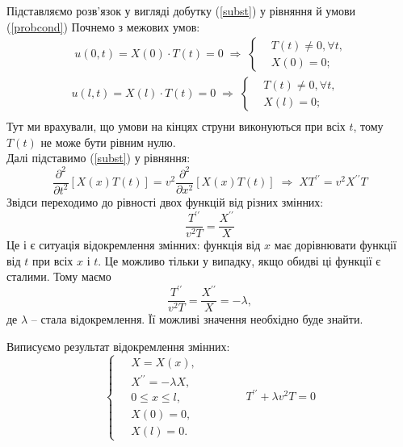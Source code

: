 Підставляємо розв'язок у вигляді добутку (\ref{subst})  у рівняння й умови (\ref{probcond}) Почнемо з межових умов:
\begin{equation*}
    \begin{aligned}
        \;u(0,t) = X(0) \cdot T(t) = 0
        \;\Rightarrow\;
        \left\{ \begin{aligned}
            &T(t) \neq 0, \forall t, \\  &X(0) = 0; 
        \end{aligned} \right.\\
        u(l,t) = X(l) \cdot T(t) = 0
        \;\Rightarrow\;
        \left\{ \begin{aligned}
            &T(t) \neq 0, \forall t, \\  &X(l) = 0; 
        \end{aligned} \right.\\
    \end{aligned}
\end{equation*}
Тут ми врахували, що умови на кінцях струни виконуються при всіх $t$, тому $T(t)$ не може бути рівним нулю.\\
Далі підставимо (\ref{subst}) у рівняння:
\begin{equation*}
    \frac{\partial^2}{\partial t^2}\left[X(x)T(t)\right] = v^2 \frac{\partial^2}{\partial x^2}\left[X(x)T(t)\right]
    \;\Rightarrow\; 
    X T^{\prime\prime} = v^2 X^{\prime\prime} T 
\end{equation*}
Звідси переходимо до рівності двох функцій від різних змінних:
\begin{equation}
    \frac{T^{\prime\prime}}{v^2T} = \frac{X^{\prime\prime}}{X}
\end{equation}
Це і є ситуація відокремлення змінних: функція від $x$ має дорівнювати функції від $t$ при всіх $x$ і $t$. Це можливо тільки у випадку, якщо обидві ці функції є сталими. Тому маємо
\begin{equation} \label{managedvar}
    \frac{T^{\prime\prime}}{v^2T} = \frac{X^{\prime\prime}}{X} = - \lambda,
\end{equation}
де $\lambda$ -- стала відокремлення. Її можливі значення необхідно буде знайти.

Виписуємо результат відокремлення змінних:
\begin{equation} \label{sepvar}
    \left\{ \begin{aligned}
        \;&X = X(x), \\  &X^{\prime\prime} = -\lambda X, \\ &0 \leq x \leq l, \\  &X(0) = 0, \\ &X(l) = 0. 
    \end{aligned} \right.
    \qquad\qquad
    T^{\prime\prime} + \lambda v^2 T = 0
\end{equation}

